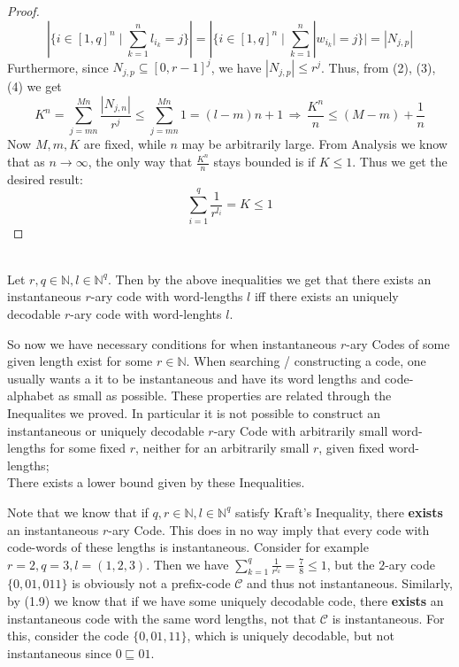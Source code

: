 \documentclass[12pt]{article}
\newenvironment{statement2}[2]{\begin{trivlist}
\item[\hskip \labelsep {\bfseries #1}\hskip \labelsep {\bfseries #2}]}{\end{trivlist}}
\newenvironment{statement3}[3]{\begin{trivlist}
\item[\hskip \labelsep {\bfseries #1}\hskip \labelsep {\bfseries #2} {#3}\textbf{.}]}{\end{trivlist}}
\begin{document}
\begin{statement3}{(1.8)}{Theorem}{(McMillan's Inequality)}
\begin{proof}
\begin{equation}
            |\{i \in [1,q]^n \mid \sum_{k=1}^{n} l_{i_k} = j\}|
            = |\{i \in [1,q]^n \mid \sum_{k=1}^{n} |w_{i_k}| = j\}| \tag{4}
            = |N_{j,p}|
        \end{equation}
        Furthermore, since $N_{j,p} \subseteq [0,r-1]^j$, we have $|N_{j,p}| \leq r^j$. Thus, from (2), (3), (4) we get
        $$
            K^n = \sum_{j = mn}^{Mn} \frac{|N_{j,n}|}{r^j} \leq \sum_{j = mn}^{Mn} 1 = (l-m)n + 1
            \,\Longrightarrow\, \frac{K^n}{n} \leq (M-m) + \frac{1}{n}
        $$
        Now $M,m,K$ are fixed, while $n$ may be arbitrarily large. From Analysis we know
        that as $n \to \infty$, the only way that $\frac{K^n}{n}$ stays bounded is if $K \leq 1$.
        Thus we get the desired result:
        $$
            \sum_{i=1}^{q} \frac{1}{r^{l_i}} = K \leq 1
        $$
    \end{proof}
\end{statement3}

\begin{statement2}{(1.9)}{Corollary.}\strut\\[2pt]
    Let $r,q \in \mathbb{N}, l \in \mathbb{N}^q$. Then by the above inequalities we get
    that there exists an instantaneous $r$-ary code with word-lengths $l$ iff
    there exists an uniquely decodable $r$-ary code with word-lenghts $l$.
\end{statement2}

So now we have necessary conditions for when instantaneous $r$-ary Codes of some
given length exist for some $r \in \mathbb{N}$.
When searching / constructing a code, one usually wants a it to be instantaneous and have
its word lengths and code-alphabet as small as possible.
These properties are related through the Inequalites we proved.
In particular it is not possible to construct an instantaneous or uniquely decodable $r$-ary Code
with arbitrarily small word-lengths for some fixed $r$, neither for an arbitrarily small
$r$, given fixed word-lengths;\\
There exists a lower bound given by these Inequalities.

\begin{statement2}{(1.10)}{Remark.}
    Note that we know that if $q,r \in \mathbb{N}, l \in \mathbb{N}^q$
    satisfy Kraft's Inequality, there \textbf{exists} an instantaneous $r$-ary Code. This does in no way imply
    that every code with code-words of these lengths is instantaneous. Consider for example
    $r = 2, q = 3, l = (1,2,3)$. Then we have $\sum_{k=1}^{q} \frac{1}{r^{l_k}} = \frac{7}{8} \leq 1$,
    but the $2$-ary code $\{0, 01, 011\}$ is obviously not a prefix-code $\mathcal{C}$ and thus not instantaneous.
    Similarly, by (1.9) we know that if we have some uniquely decodable code, there \textbf{exists} an
    instantaneous code with the same word lengths, not that $\mathcal{C}$ is instantaneous. For this,
    consider the code $\{0,01,11\}$, which is uniquely decodable, but not instantaneous since $0 \sqsubseteq 01$.
\end{statement2}
\end{document}
